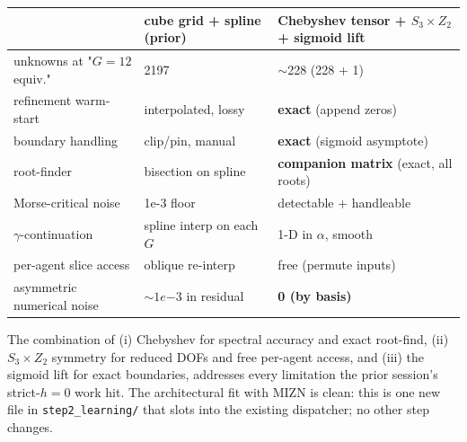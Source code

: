 \documentclass[11pt]{article}
\begin{document}
\begin{center}\begin{tabular}{lll}\toprule
& cube grid + spline (prior) & Chebyshev tensor + $S_3 \times Z_2$ + sigmoid lift \\\midrule
unknowns at "$G=12$ equiv." & 2197 & $\sim$228 (228 + 1) \\
refinement warm-start & interpolated, lossy & \textbf{exact} (append zeros) \\
boundary handling & clip/pin, manual & \textbf{exact} (sigmoid asymptote) \\
root-finder & bisection on spline & \textbf{companion matrix} (exact, all roots) \\
Morse-critical noise & 1e-3 floor & detectable + handleable \\
$\gamma$-continuation & spline interp on each $G$ & 1-D in $\alpha$, smooth \\
per-agent slice access & oblique re-interp & free (permute inputs) \\
asymmetric numerical noise & $\sim 1e{-3}$ in residual & \textbf{0 (by basis)} \\
\bottomrule\end{tabular}\end{center}

The combination of (i) Chebyshev for spectral accuracy and exact root-find,
(ii) $S_3 \times Z_2$ symmetry for reduced DOFs and free per-agent access,
and (iii) the sigmoid lift for exact boundaries, addresses every limitation
the prior session's strict-$h{=}0$ work hit. The architectural fit with
MIZN is clean: this is one new file in \texttt{step2\_learning/} that slots
into the existing dispatcher; no other step changes.
\end{document}
